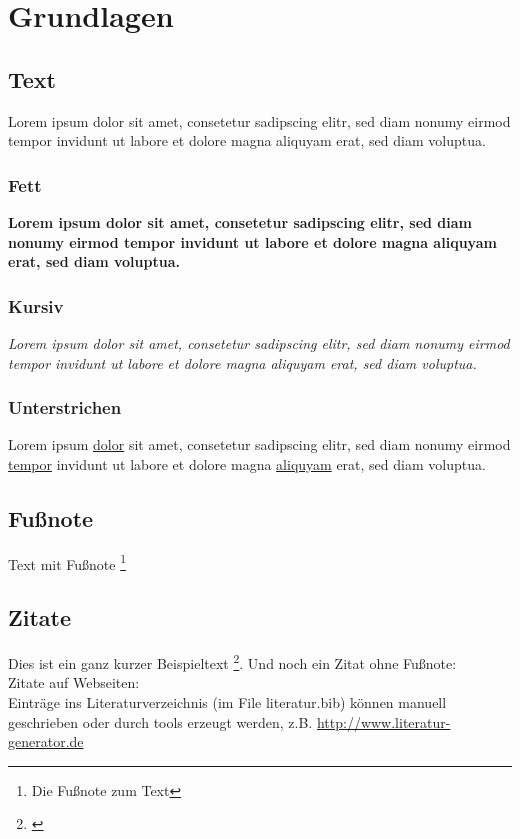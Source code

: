 \chapter{Grundlagen}
\section{Text}
Lorem ipsum dolor sit amet, consetetur sadipscing elitr, sed diam nonumy eirmod tempor invidunt ut labore et dolore magna aliquyam erat, sed diam voluptua.

\subsection{Fett}
\textbf{Lorem ipsum dolor sit amet, consetetur sadipscing elitr, sed diam nonumy eirmod tempor invidunt ut labore et dolore magna aliquyam erat, sed diam voluptua.}

\subsection{Kursiv}
\textit{Lorem ipsum dolor sit amet, consetetur sadipscing elitr, sed diam nonumy eirmod tempor invidunt ut labore et dolore magna aliquyam erat, sed diam voluptua.}

\subsection{Unterstrichen}
Lorem ipsum \underline{dolor} sit amet, consetetur sadipscing elitr, sed diam nonumy eirmod \underline{tempor} invidunt ut labore et dolore magna \underline{aliquyam} erat, sed diam voluptua.

\section{Fußnote}

Text mit Fußnote \footnote{Die Fußnote zum Text} 

\section{Zitate}

Dies ist ein ganz kurzer Beispieltext \footnote{\cite{Richter2016}}. Und noch ein Zitat ohne Fußnote: \cite{Jacobsen2017}
\\
Zitate auf Webseiten: \cite{PlutoRed}
\\
Einträge ins Literaturverzeichnis (im File literatur.bib) können manuell geschrieben oder durch tools erzeugt werden, z.B. \url{http://www.literatur-generator.de}


